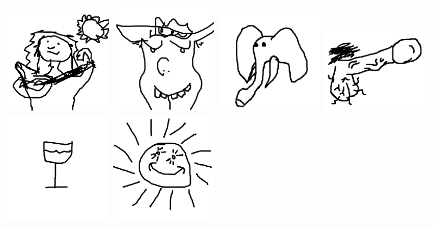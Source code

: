 \includegraphics[width=0.2\textwidth]{art/Safari_75.png}
\includegraphics[width=0.2\textwidth]{art/Safari_76.png}
\includegraphics[width=0.2\textwidth]{art/Safari_77.png}
\includegraphics[width=0.2\textwidth]{art/Safari_78.png}
\includegraphics[width=0.2\textwidth]{art/Safari_8.png}
\includegraphics[width=0.2\textwidth]{art/Safari_9.png}
